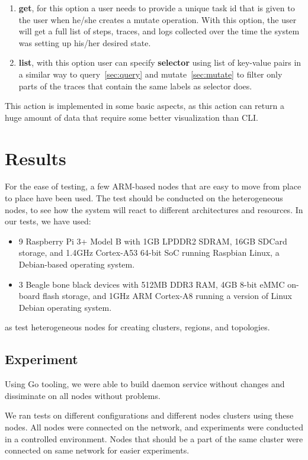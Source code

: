\begin{enumerate}[start=1,label={(\bfseries \arabic*)}]
	\item \textbf{get}, for this option a user needs to provide a unique task id that is given to the user when he/she creates a mutate operation. With this option, the user will get a full list of steps, traces, and logs collected over the time the system was setting up his/her desired state.  
	\item \textbf{list}, with this option user can specify \textbf{selector} using list of key-value pairs in a similar way to query~\ref{sec:query} and mutate~\ref{sec:mutate} to filter only parts of the traces that contain the same labels as selector does.
\end{enumerate}

\noindent
This action is implemented in some basic aspects, as this action can return a huge amount of data that require some better visualization than CLI.
%
%
\section{Results}\label{sec:results}
% 
For the ease of testing, a few ARM-based nodes that are easy to move from place to place have been used. The test should be conducted on the heterogeneous nodes, to see how the system will react to different architectures and resources. In our tests, we have used:

\begin{itemize}
	\item 9 Raspberry Pi 3+ Model B with 1GB LPDDR2 SDRAM, 16GB SDCard storage, and 1.4GHz Cortex-A53 64-bit SoC running Raspbian Linux, a Debian-based operating system.
	\item 3 Beagle bone black devices with 512MB DDR3 RAM, 4GB 8-bit eMMC on-board flash storage, and 1GHz ARM Cortex-A8 running a version of Linux Debian operating system.
\end{itemize}

\noindent
as test heterogeneous nodes for creating clusters, regions, and topologies.
%
%
\subsection{Experiment}\label{sec:experiment}
%
Using Go tooling, we were able to build daemon service without changes and dissiminate on all nodes without problems.

We ran tests on different configurations and different nodes clusters using these nodes. All nodes were connected on the network, and experiments were conducted in a controlled environment. Nodes that should be a part of the same cluster were connected on same network for easier experiments.

